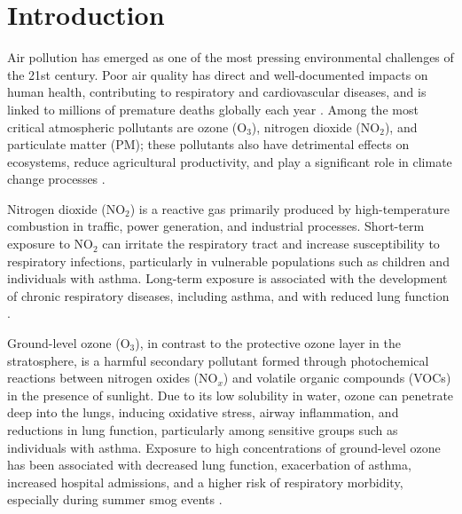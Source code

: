 \chapter[Introduction]{Introduction}
\label{chap:intro}





Air pollution has emerged as one of the most pressing environmental challenges of the 21st century. Poor air quality has direct and well-documented impacts on human health, contributing to respiratory and cardiovascular diseases, and is linked to millions of premature deaths globally each year \cite{world2021global, nishida2022impact, rajagopalan2021pollution}. Among the most critical atmospheric pollutants are ozone (O$_3$), nitrogen dioxide (NO$_2$), and particulate matter (PM); these pollutants also have detrimental effects on ecosystems, reduce agricultural productivity, and play a significant role in climate change processes \cite{watson2016impact, fuzzi2015particulate, whoAmbientoutdoor}.

Nitrogen dioxide (NO$_2$) is a reactive gas primarily produced by high-temperature combustion in traffic, power generation, and industrial processes. Short-term exposure to NO$_2$ can irritate the respiratory tract and increase susceptibility to respiratory infections, particularly in vulnerable populations such as children and individuals with asthma. Long-term exposure is associated with the development of chronic respiratory diseases, including asthma, and with reduced lung function \cite{whoTypesPollutants, cao2025short, liu2021long}.

Ground-level ozone (O$_3$), in contrast to the protective ozone layer in the stratosphere, is a harmful secondary pollutant formed through photochemical reactions between nitrogen oxides (NO$_x$) and volatile organic compounds (VOCs) in the presence of sunlight. Due to its low solubility in water, ozone can penetrate deep into the lungs, inducing oxidative stress, airway inflammation, and reductions in lung function, particularly among sensitive groups such as individuals with asthma. Exposure to high concentrations of ground-level ozone has been associated with decreased lung function, exacerbation of asthma, increased hospital admissions, and a higher risk of respiratory morbidity, especially during summer smog events \cite{whoTypesPollutants, zheng2021short, tiotiu2020impact}.

